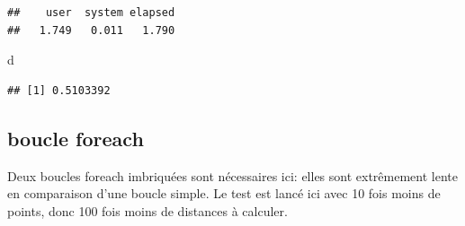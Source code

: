 \documentclass[
  11pt,
  french,
  a4paper,
  extrafontsizes,onecolumn,openright
  ]{memoir}
\newenvironment{Shaded}{\begin{snugshade}}{\end{snugshade}}
\newcommand{\AttributeTok}[1]{\textcolor[rgb]{0.77,0.63,0.00}{#1}}
\newcommand{\ControlFlowTok}[1]{\textcolor[rgb]{0.13,0.29,0.53}{\textbf{#1}}}
\newcommand{\DecValTok}[1]{\textcolor[rgb]{0.00,0.00,0.81}{#1}}
\newcommand{\FunctionTok}[1]{\textcolor[rgb]{0.00,0.00,0.00}{#1}}
\newcommand{\NormalTok}[1]{#1}
\newcommand{\OtherTok}[1]{\textcolor[rgb]{0.56,0.35,0.01}{#1}}
\newcommand{\SpecialCharTok}[1]{\textcolor[rgb]{0.00,0.00,0.00}{#1}}
\newcommand{\StringTok}[1]{\textcolor[rgb]{0.31,0.60,0.02}{#1}}
\begin{document}
\begin{verbatim}
##    user  system elapsed 
##   1.749   0.011   1.790
\end{verbatim}

\begin{Shaded}
\begin{Highlighting}[]
\NormalTok{d}
\end{Highlighting}
\end{Shaded}

\begin{verbatim}
## [1] 0.5103392
\end{verbatim}

\normalsize

\hypertarget{boucle-foreach}{%
\subsection{boucle foreach}\label{boucle-foreach}}

Deux boucles foreach imbriquées sont nécessaires ici: elles sont extrêmement lente en comparaison d'une boucle simple.
Le test est lancé ici avec 10 fois moins de points, donc 100 fois moins de distances à calculer.

\scriptsize

\begin{Shaded}
\end{Shaded}
\end{document}
